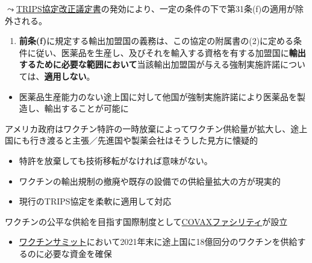 \documentclass[
  xelatex,
  ja=standard]{bxjsarticle}
\providecommand{\tightlist}{%
  \setlength{\itemsep}{0pt}\setlength{\parskip}{0pt}}\usepackage{longtable,booktabs,array}
\begin{document}
\(\leadsto\)\href{https://www.mofa.go.jp/mofaj/gaiko/treaty/treaty166_11_gai.html}{TRIPS協定改正議定書}の発効により、一定の条件の下で第31条(f)の適用が除外される。

\begin{tcolorbox}[enhanced jigsaw, toprule=.15mm, leftrule=.75mm, coltitle=black, opacityback=0, colback=white, title=\textcolor{quarto-callout-note-color}{\faInfo}\hspace{0.5em}{\href{https://www.jpo.go.jp/system/laws/gaikoku/trips/index.html}{TRIPS協定}　第31条の2}, rightrule=.15mm, bottomrule=.15mm, colbacktitle=quarto-callout-note-color!10!white, opacitybacktitle=0.6, titlerule=0mm, colframe=quarto-callout-note-color-frame, bottomtitle=1mm, toptitle=1mm, arc=.35mm, left=2mm, breakable]

\begin{enumerate}
\def\labelenumi{\arabic{enumi}.}
\tightlist
\item
  \textbf{前条(f)}に規定する輸出加盟国の義務は、この協定の附属書の(2)に定める条件に従い、医薬品を生産し、及びそれを輸入する資格を有する加盟国に\textbf{輸出するために必要な範囲において}当該輸出加盟国が与える強制実施許諾については、\textbf{適用しない}。
\end{enumerate}

\end{tcolorbox}

\begin{itemize}
\tightlist
\item
  医薬品生産能力のない途上国に対して他国が強制実施許諾により医薬品を製造し、輸出することが可能に
\end{itemize}

アメリカ政府はワクチン特許の一時放棄によってワクチン供給量が拡大し、途上国にも行き渡ると主張／先進国や製薬会社はそうした見方に懐疑的

\begin{itemize}
\tightlist
\item
  特許を放棄しても技術移転がなければ意味がない。
\item
  ワクチンの輸出規制の撤廃や既存の設備での供給量拡大の方が現実的
\item
  現行のTRIPS協定を柔軟に適用して対応
\end{itemize}

ワクチンの公平な供給を目指す国際制度として\href{https://www.mhlw.go.jp/content/10501000/000672596.pdf}{COVAXファシリティ}が設立

\begin{itemize}
\tightlist
\item
  \href{https://www.mofa.go.jp/mofaj/page1_000979.html}{ワクチンサミット}において2021年末に途上国に18億回分のワクチンを供給するのに必要な資金を確保
\end{itemize}
\end{document}
